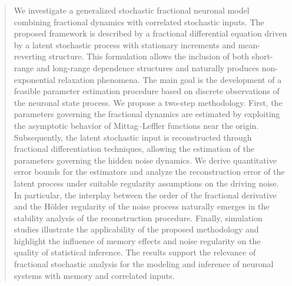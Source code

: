 \documentclass[11pt,reqno,oneside, a4paper]{amsart}
\numberwithin{equation}{section}
\theoremstyle{remark}
\begin{document}
\begin{abstract}
We investigate a generalized stochastic fractional neuronal model combining
fractional dynamics with correlated stochastic inputs. The proposed framework is
described by a fractional differential equation driven by a latent stochastic process
with stationary increments and mean-reverting structure. This formulation allows the inclusion of both short-range and long-range
dependence structures and naturally produces non-exponential relaxation phenomena.
The main goal is the development of a feasible parameter estimation
procedure based on discrete observations of the neuronal state process. We propose
a two-step methodology. First, the parameters governing the fractional dynamics are
estimated by exploiting the asymptotic behavior of Mittag--Leffler functions near
the origin. Subsequently, the latent stochastic input is reconstructed through
fractional differentiation techniques, allowing the estimation of the parameters
governing the hidden noise dynamics.
We derive quantitative error bounds for the estimators and analyze the reconstruction
error of the latent process under suitable regularity assumptions on the driving
noise. In particular, the interplay between the order of the fractional derivative
and the H\"older regularity of the noise process naturally emerges in the stability
analysis of the reconstruction procedure.
Finally, simulation studies illustrate the applicability of the proposed methodology
and highlight the influence of memory effects and noise regularity on the quality
of statistical inference. The results support the relevance of fractional stochastic
analysis for the modeling and inference of neuronal systems with memory and correlated
inputs.
\end{abstract}




\allowdisplaybreaks


\maketitle

{\footnotesize\tableofcontents}
\end{document}
